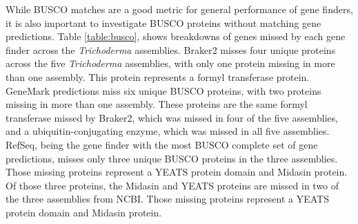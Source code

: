 While BUSCO matches are a good metric for general performance of gene
finders, it is also important to investigate BUSCO proteins without
matching gene predictions. Table \ref{table:busco}, shows breakdowns
of genes missed by each gene finder across the \textit{Trichoderma}
assemblies. Braker2 misses four unique proteins across the five
\textit{Trichoderma} assemblies, with only one protein missing in more
than one assembly. This protein represents a formyl transferase
protein. GeneMark predictions miss six unique BUSCO proteins, with two
proteins missing in more than one assembly. These proteins are the
same formyl transferase missed by Braker2, which was missed in four of
the five assemblies, and a ubiquitin-conjugating enzyme, which was
missed in all five assemblies. RefSeq, being the gene finder with the
most BUSCO complete set of gene predictions, misses only three unique
BUSCO proteins in the three assemblies. Those missing proteins
represent a YEATS protein domain and Midasin protein. Of those three
proteins, the Midasin and YEATS proteins are missed in two of the
three assemblies from NCBI. Those missing proteins represent a YEATS
protein domain and Midasin protein.




